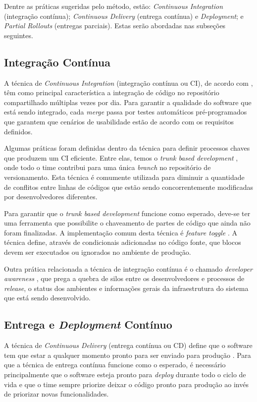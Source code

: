 Dentre as práticas sugeridas pelo método, estão: \emph{Continuous Integration} (integração contínua);  \emph{Continuous Delivery} (entrega contínua) e \emph{Deployment}; e \emph{Partial Rollouts} (entregas parciais). Estas serão abordadas nas subseções seguintes.

\subsection{Integração Contínua}

A técnica de \emph{Continuous Integration} (integração contínua ou CI), de acordo com \cite{fowlerCI}, têm como principal característica a integração de código no repositório compartilhado múltiplas vezes por dia. Para garantir a qualidade do software que está sendo integrado, cada \emph{merge} passa por testes automáticos pré-programados que garantem que cenários de usabilidade estão de acordo com os requisitos definidos. 

Algumas práticas foram definidas dentro da técnica para definir processos chaves que produzem um CI eficiente. Entre elas, temos o \emph{trunk based development} \cite{devAndDeploymentFB}, onde todo o time contribui para uma única \emph{branch} no repositório de versionamento. Esta técnica é comumente utilizada para diminuir a quantidade de conflitos entre linhas de códigos que estão sendo concorrentemente modificadas por desenvolvedores diferentes. 

Para garantir que o \emph{trunk based development} funcione como esperado, deve-se ter uma ferramenta que possibilite o chaveamento de partes de código que ainda não foram finalizadas. A implementação comum desta técnica é \emph{feature toggle} \cite{featureToggles}. A técnica define, através de condicionais adicionadas no código fonte, que blocos devem ser executados ou ignorados no ambiente de produção.

Outra prática relacionada a técnica de integração contínua é o chamado \emph{developer awareness} \cite{awa}, que prega a quebra de silos entre os desenvolvedores e processos de \emph{release}, o status dos ambientes e informações gerais da infraestrutura do sistema que está sendo desenvolvido.

\subsection{Entrega e \emph{Deployment} Contínuo}

A técnica de \emph{Continuous Delivery} (entrega contínua ou CD) define que o software tem que estar a qualquer momento pronto para ser enviado para produção \cite{fowlerCD}. Para que a técnica de entrega contínua funcione como o esperado, é necessário principalmente que o software esteja pronto para \emph{deploy} durante todo o ciclo de vida e que o time sempre priorize deixar o código pronto para produção ao invés de priorizar novas funcionalidades.

